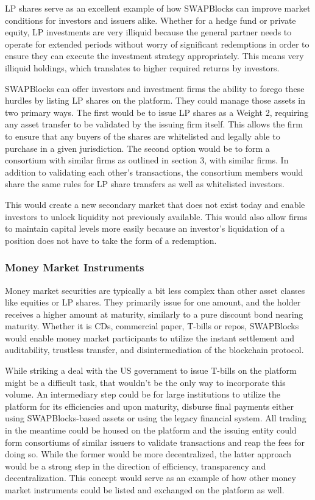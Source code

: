 \documentclass[12pt]{article}
\begin{document}
LP shares serve as an excellent example of how SWAPBlocks can improve market conditions for investors and 
issuers alike. Whether for a hedge fund or private equity, LP investments are very illiquid because the 
general partner needs to operate for extended periods without worry of significant redemptions in order to 
ensure they can execute the investment strategy appropriately. This means very illiquid holdings, 
which translates to higher required returns by investors.

SWAPBlocks can offer investors and investment firms the ability to forego these hurdles by listing LP shares on the 
platform. They could manage those assets in two primary ways. The first would be to issue LP shares as a Weight 2, 
requiring any asset transfer to be validated by the issuing firm itself. This allows the firm to ensure that any 
buyers of the shares are whitelisted and legally able to purchase in a given jurisdiction. The second option would 
be to form a consortium with similar firms as outlined in section 3, with similar firms. In addition to validating each other’s 
transactions, the consortium members would share the same rules for LP share transfers as well as whitelisted investors.

This would create a new secondary market that does not exist today and enable investors to unlock liquidity not 
previously available. This would also allow firms to maintain capital levels more easily because an investor's
liquidation of a position does not have to take the form of a redemption.

\subsubsection{Money Market Instruments}

Money market securities are typically a bit less complex than other asset classes like equities or LP shares. They 
primarily issue for one amount, and the holder receives a higher amount at maturity, similarly to a pure discount 
bond nearing maturity. Whether it is CDs, commercial paper, T-bills or repos, SWAPBlocks would enable money market 
participants to utilize the instant settlement and auditability, trustless transfer, and disintermediation of 
the blockchain protocol.

While striking a deal with the US government to issue T-bills on the platform might be a difficult task, that 
wouldn’t be the only way to incorporate this volume. An intermediary step could be for large institutions to 
utilize the platform for its efficiencies and upon maturity, disburse final payments either using SWAPBlocks-based 
assets or using the legacy financial system. All trading in the meantime could be housed on the platform and the 
issuing entity could form consortiums of similar issuers to validate transactions and reap the fees for doing so. 
While the former would be more decentralized, the latter approach would be a strong step in the direction of 
efficiency, transparency and decentralization. This concept would serve as an example of how other money market 
instruments could be listed and exchanged on the platform as well.
\end{document}
